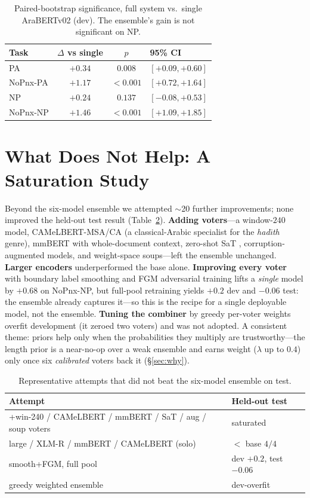 \begin{table}[t]\centering\small
\begin{tabular}{lccl}
\toprule
Task & $\Delta$\fone{} vs single & $p$ & 95\% CI \\
\midrule
PA       & $+0.34$ & $0.008$ & $[+0.09,+0.60]$ \\
NoPnx-PA & $+1.17$ & $<0.001$ & $[+0.72,+1.64]$ \\
NP       & $+0.24$ & $0.137$ & $[-0.08,+0.53]$ \\
NoPnx-NP & $+1.46$ & $<0.001$ & $[+1.09,+1.85]$ \\
\bottomrule
\end{tabular}
\caption{Paired-bootstrap significance, full system vs.\ single AraBERTv02 (dev).
The ensemble's gain is not significant on NP.}
\label{tab:sig}
\end{table}

\section{What Does Not Help: A Saturation Study}\label{sec:saturation}
Beyond the six-model ensemble we attempted $\sim$20 further improvements; none
improved the held-out test result (Table~\ref{tab:negative}).
\textbf{Adding voters}---a window-$240$ model, CAMeLBERT-MSA/CA (a classical-Arabic
specialist for the \textit{had{\=\i}th} genre), mmBERT with whole-document context,
zero-shot SaT \citep{frohmann2024sat}, corruption-augmented models, and weight-space
soups---left the ensemble unchanged. \textbf{Larger encoders} underperformed the base
alone. \textbf{Improving every voter} with boundary label smoothing and FGM
adversarial training \citep{miyato2017adversarial} lifts a \emph{single} model by
$+0.68$ on NoPnx-NP, but full-pool retraining yields $+0.2$ dev and $-0.06$ test:
the ensemble already captures it---so this is the recipe for a single deployable
model, not the ensemble. \textbf{Tuning the combiner} by greedy per-voter weights
overfit development (it zeroed two voters) and was not adopted. A consistent theme:
priors help only when the probabilities they multiply are trustworthy---the length
prior is a near-no-op over a weak ensemble and earns weight ($\lambda$ up to $0.4$)
only once six \emph{calibrated} voters back it (\S\ref{sec:why}).

\begin{table}[t]\centering\small
\begin{tabular}{p{4.7cm}p{2.3cm}}
\toprule
Attempt & Held-out test \\
\midrule
+win-240 / CAMeLBERT / mmBERT / SaT / aug / soup voters & saturated \\
large / XLM-R / mmBERT / CAMeLBERT (solo) & $<$ base $4/4$ \\
smooth+FGM, full pool & dev $+0.2$, test $-0.06$ \\
greedy weighted ensemble & dev-overfit \\
\bottomrule
\end{tabular}
\caption{Representative attempts that did not beat the six-model ensemble on test.}
\label{tab:negative}
\end{table}

